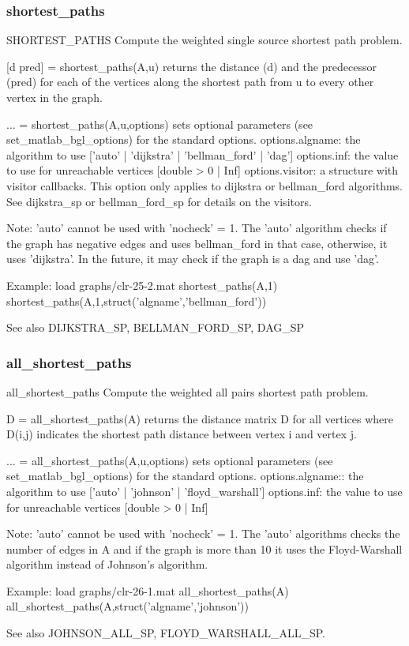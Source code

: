 \subsubsection*{shortest\_paths}
\begin{mcode}
  SHORTEST_PATHS Compute the weighted single source shortest path problem.
 
  [d pred] = shortest_paths(A,u) returns the distance (d) and the predecessor
  (pred) for each of the vertices along the shortest path from u to every
  other vertex in the graph.  
  
  ... = shortest_paths(A,u,options) sets optional parameters (see 
  set_matlab_bgl_options) for the standard options.
    options.algname: the algorithm to use 
        [{'auto'} | 'dijkstra' | 'bellman_ford' | 'dag']
    options.inf: the value to use for unreachable vertices 
        [double > 0 | {Inf}]
    options.visitor: a structure with visitor callbacks.  This option only
        applies to dijkstra or bellman_ford algorithms.  See dijkstra_sp or
        bellman_ford_sp for details on the visitors.
 
  Note: 'auto' cannot be used with 'nocheck' = 1.  The 'auto' algorithm
  checks if the graph has negative edges and uses bellman_ford in that
  case, otherwise, it uses 'dijkstra'.  In the future, it may check if the
  graph is a dag and use 'dag'.  
 
  Example:
     load graphs/clr-25-2.mat
     shortest_paths(A,1)
     shortest_paths(A,1,struct('algname','bellman_ford'))
 
  See also DIJKSTRA_SP, BELLMAN_FORD_SP, DAG_SP
\end{mcode}
\newpage
\subsubsection*{all\_shortest\_paths}
\begin{mcode}
  all_shortest_paths Compute the weighted all pairs shortest path problem.
 
  D = all_shortest_paths(A) returns the distance matrix D for all vertices
  where D(i,j) indicates the shortest path distance between vertex i and
  vertex j.  
  
  ... = all_shortest_paths(A,u,options) sets optional parameters (see 
  set_matlab_bgl_options) for the standard options.
    options.algname:: the algorithm to use 
        [{'auto'} | 'johnson' | 'floyd_warshall']
    options.inf: the value to use for unreachable vertices 
        [double > 0 | {Inf}]
 
  Note: 'auto' cannot be used with 'nocheck' = 1.  The 'auto' algorithms
  checks the number of edges in A and if the graph is more than 10%
  it uses the Floyd-Warshall algorithm instead of Johnson's algorithm.
 
  Example:
     load graphs/clr-26-1.mat
     all_shortest_paths(A)
     all_shortest_paths(A,struct('algname','johnson'))
 
  See also JOHNSON_ALL_SP, FLOYD_WARSHALL_ALL_SP.
\end{mcode}
\newpage
